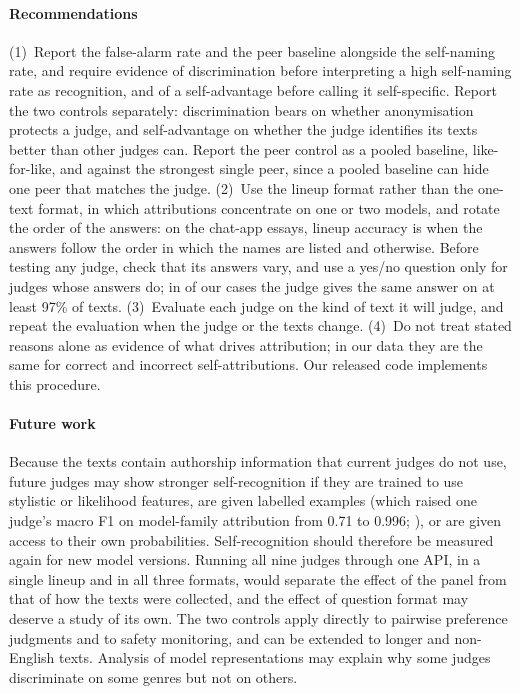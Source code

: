 \paragraph{Recommendations}
(1)~Report the false-alarm rate and the peer baseline alongside the self-naming
rate, and require evidence of discrimination before interpreting a high
self-naming rate as recognition, and of a self-advantage before calling it
self-specific. Report the two controls separately: discrimination bears on
whether anonymisation protects a judge, and self-advantage on whether the
judge identifies its texts better than other judges can. Report the peer
control as a pooled baseline, like-for-like, and against the strongest single
peer, since a pooled baseline can hide one peer that matches the judge. (2)~Use the lineup format rather than the one-text
format, in which attributions concentrate on one or two models, and rotate the
order of the answers: on the chat-app essays, lineup accuracy is
\CRAccListedChat{} when the answers follow the order in which the names are
listed and \CRAccOtherChat{} otherwise. Before testing any judge, check that
its answers vary, and use a yes/no question only for judges whose answers do;
in \CXFixedCells{} of our \CVcells{} cases the judge gives the same answer on
at least 97\% of texts. (3)~Evaluate each
judge on the kind of text it will judge, and repeat the evaluation when the judge
or the texts change. (4)~Do not treat stated reasons alone as evidence of what drives
attribution; in our data they are the same for correct and incorrect
self-attributions. Our released code implements this procedure.

\paragraph{Future work}
Because the texts contain authorship information that current judges do not
use, future judges may show stronger self-recognition if they are trained to
use stylistic or likelihood features, are given labelled examples (which raised
one judge's macro F1 on model-family attribution from 0.71 to 0.996;
\citealp{dietrich2026splits}), or are given access to their own probabilities.
Self-recognition should therefore be measured again for new model versions.
Running all nine judges through one API, in a single lineup and in all three
formats, would separate the effect of the panel from that of how the texts
were collected, and the effect of question format may deserve a study of its
own. The two controls apply directly to pairwise
preference judgments and to safety monitoring, and can be extended to longer and
non-English texts. Analysis of model representations
\citep{ackerman2025inspection} may explain why some judges discriminate on some
genres but not on others.

